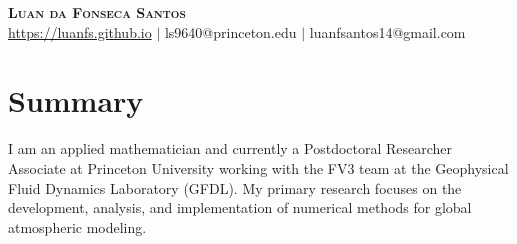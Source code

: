 \documentclass[letterpaper,11pt]{article}
\begin{document}

\begin{center}
    \textbf{\Huge \scshape Luan da Fonseca Santos} \\ \vspace{1pt}
    \href{https://luanfs.github.io}{https://luanfs.github.io} $|$
    ls9640@princeton.edu
    $|$  
    {luanfsantos14@gmail.com} 
\end{center}

\section{Summary}
I am an applied mathematician and currently a Postdoctoral Researcher Associate at Princeton University working with the FV3 team at the Geophysical Fluid Dynamics Laboratory (GFDL).
My primary research focuses on the development, analysis, and implementation of numerical methods for global atmospheric modeling.


\end{document}
